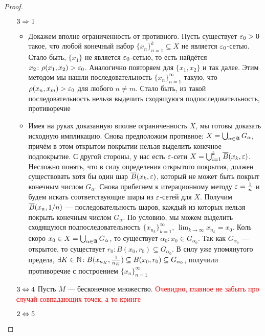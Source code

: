 \begin{proof}
\begin{enumerate}
		\item[$3 \Rightarrow 1$] 
		\begin{itemize}
			\item Докажем вполне ограниченность от противного. Пусть существует $\varepsilon_0 > 0$ такое, что любой конечный набор $\{x_n\}_{n = 1}^k \subseteq X$ не является $\varepsilon_0$-сетью. Стало быть, $\{x_1\}$ не является $\varepsilon_0$-сетью, то есть найдётся $x_2 \colon \rho(x_1, x_2) > \varepsilon_0$. Аналогично повторяем для $\{x_1, x_2\}$ и так далее. Этим методом мы нашли последовательность $\{x_n\}_{n = 1}^\infty$ такую, что $\rho(x_n, x_m) > \varepsilon_0$ для любого $n \neq m$. Стало быть, из такой последовательность нельзя выделить сходящуюся подпоследовательность, противоречие
			
			\item Имея на руках доказанную вполне ограниченность $X$, мы готовы доказать исходную импликацию. Снова предположим противное: $X = \bigcup_{\alpha \in \mathfrak{A}} G_\alpha$, причём в этом открытом покрытии нельзя выделить конечное подпокрытие. С другой стороны, у нас есть $\varepsilon$-сети $X = \bigcup_{i = 1}^k \overline{B}(x_k, \varepsilon)$. Несложно понять, что в силу определения открытого покрытия, должен существовать хотя бы один шар $\overline{B}(x_k, \varepsilon)$, который не может быть покрыт конечным числом $G_\alpha$. Снова прибегнем к итерационному методу $\varepsilon = \frac{1}{n}$ и будем искать соответствующие шары из $\varepsilon$-сетей для $X$. Получим $\overline{B}(x_n, 1 / n)$ --- последовательность шаров, каждый из которых нельзя покрыть конечным числом $G_\alpha$. По условию, мы можем выделить сходящуюся подпоследовательность $\{x_{n_k}\}_{k = 1}^\infty$, $\lim_{k \to \infty} x_{n_k} = x_0$. Коль скоро $x_0 \in X = \bigcup_{\alpha \in \mathfrak{A}} G_\alpha$, то существует $\alpha_0 \colon x_0 \in G_{\alpha_0}$. Так как $G_{\alpha_0}$ --- открытое, то существует $r_0 \colon B(x_0, r_0) \subseteq G_{\alpha_0}$. В силу уже упомянутого предела, $\exists K \in \mathbb{N} \colon B(x_{n_K}, \frac{1}{n_K}) \subseteq B(x_0, r_0) \subseteq G_{\alpha_0}$, получили противоречие с построением $\{x_n\}_{n = 1}^\infty$
		\end{itemize}
		
		\item[$3 \Leftrightarrow 4$] Пусть $M$ --- бесконечное множество. \textcolor{red}{Очевидно, главное не забыть про случай совпадающих точек, а то кринге}
		
		\item[$2 \Leftrightarrow 5$]
	\end{enumerate}
\end{proof}